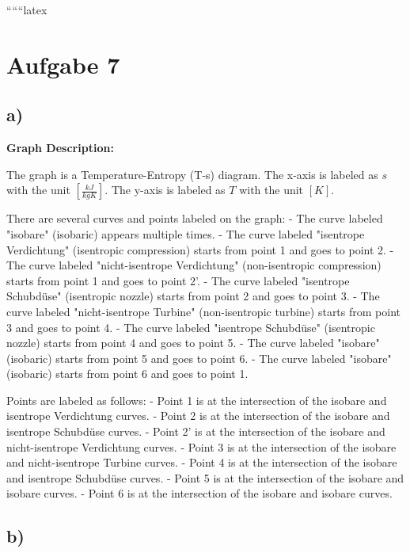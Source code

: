 
``````latex


\section*{Aufgabe 7}

\subsection*{a)}

\begin{center}
\textbf{Graph Description:}

The graph is a Temperature-Entropy (T-s) diagram. The x-axis is labeled as $s$ with the unit $\left[\frac{kJ}{kgK}\right]$. The y-axis is labeled as $T$ with the unit $[K]$. 

There are several curves and points labeled on the graph:
- The curve labeled "isobare" (isobaric) appears multiple times.
- The curve labeled "isentrope Verdichtung" (isentropic compression) starts from point 1 and goes to point 2.
- The curve labeled "nicht-isentrope Verdichtung" (non-isentropic compression) starts from point 1 and goes to point 2'.
- The curve labeled "isentrope Schubdüse" (isentropic nozzle) starts from point 2 and goes to point 3.
- The curve labeled "nicht-isentrope Turbine" (non-isentropic turbine) starts from point 3 and goes to point 4.
- The curve labeled "isentrope Schubdüse" (isentropic nozzle) starts from point 4 and goes to point 5.
- The curve labeled "isobare" (isobaric) starts from point 5 and goes to point 6.
- The curve labeled "isobare" (isobaric) starts from point 6 and goes to point 1.

Points are labeled as follows:
- Point 1 is at the intersection of the isobare and isentrope Verdichtung curves.
- Point 2 is at the intersection of the isobare and isentrope Schubdüse curves.
- Point 2' is at the intersection of the isobare and nicht-isentrope Verdichtung curves.
- Point 3 is at the intersection of the isobare and nicht-isentrope Turbine curves.
- Point 4 is at the intersection of the isobare and isentrope Schubdüse curves.
- Point 5 is at the intersection of the isobare and isobare curves.
- Point 6 is at the intersection of the isobare and isobare curves.

\end{center}

\subsection*{b)}

